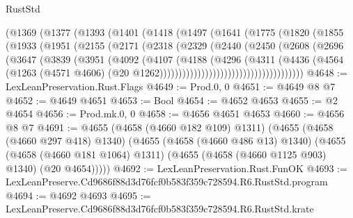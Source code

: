 \begin{lexlean}{RustStd}
\begin{coremodule}
                (@1369
                  (@1377
                    (@1393
                      (@1401
                        (@1418
                          (@1497
                            (@1641
                              (@1775
                                (@1820
                                  (@1855
                                    (@1933
                                      (@1951
                                        (@2155
                                          (@2171
                                            (@2318
                                              (@2329
                                                (@2440
                                                  (@2450
                                                    (@2608
                                                      (@2696
                                                        (@3647
                                                          (@3839
                                                            (@3951
                                                              (@4092
                                                                (@4107
                                                                  (@4188
                                                                    (@4296
                                                                      (@4311
                                                                        (@4436
                                                                          (@4564
                                                                            (@1263
                                                                              (@4571 @4606)
                                                                              (@20
                                                                                @1262))))))))))))))))))))))))))))))))))))))
@4648 := LexLeanPreservation.Rust.Flags
@4649 := Prod.{0, 0}
@4651 := @4649 @8 @7
@4652 := @4649 @4651
@4653 := Bool
@4654 := @4652 @4653
@4655 := @2 @4654
@4656 := Prod.mk.{0, 0}
@4658 := @4656 @4651 @4653
@4660 := @4656 @8 @7
@4691 := @4655
    (@4658 (@4660 @182 @109) @1311)
    (@4655
      (@4658 (@4660 @297 @418) @1340)
      (@4655
        (@4658 (@4660 @486 @13) @1340)
        (@4655
          (@4658 (@4660 @181 @1064) @1311)
          (@4655 (@4658 (@4660 @1125 @903) @1340) (@20 @4654)))))
@4692 := LexLeanPreservation.Rust.FunOK
@4693 := LexLeanPreserve.Cd9686f88d3d76fcf0b583f359c728594.R6.RustStd.program
@4694 := @4692 @4693
@4695 := LexLeanPreserve.Cd9686f88d3d76fcf0b583f359c728594.R6.RustStd.krate

\end{coremodule}
\end{lexlean}
